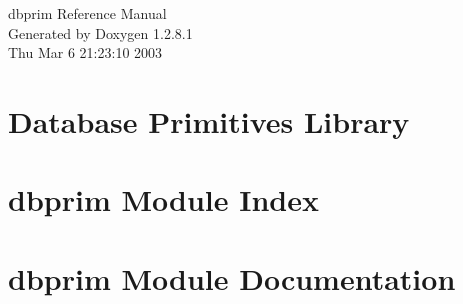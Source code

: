 \documentclass[letterpaper]{book}
\begin{document}
\begin{titlepage}
\vspace*{7cm}
\begin{center}
{\Large dbprim Reference Manual}\\
\vspace*{1cm}
{\large Generated by Doxygen 1.2.8.1}\\
\vspace*{0.5cm}
{\small Thu Mar 6 21:23:10 2003}\\
\end{center}
\end{titlepage}
\clearemptydoublepage
{}
\tableofcontents
\clearemptydoublepage
{}
\chapter{Database Primitives Library}
\label{index}
\chapter{dbprim Module Index}

\chapter{dbprim Module Documentation}




\printindex
\end{document}
